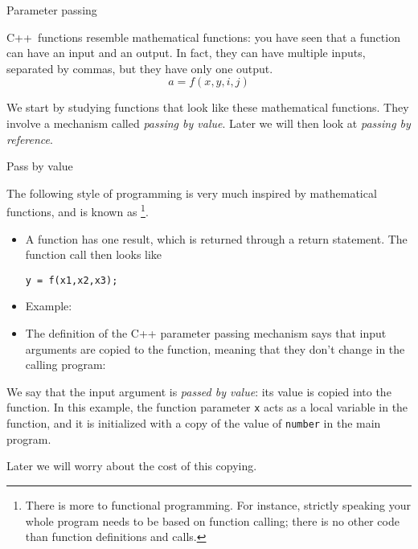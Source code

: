  {Parameter passing}
\label{sec:passing}
%

C++~functions resemble mathematical functions: you have seen that a
function can have an input and an output. In fact, they can have
multiple inputs, separated by commas, but they have only one
output.
\[ a = f(x,y,i,j) \]

We start by studying functions that look like these mathematical
functions. They involve a  mechanism
called
\emph{passing by value}.
%
Later we will then look at
\emph{passing by reference}.

 {Pass by value}
\label{sec:pass-value}

The following style of programming is very much inspired by
mathematical functions, and is known as \footnote {There is more to functional programming. For
  instance, strictly speaking your whole program needs to be based on
  function calling; there is no other code than function definitions
  and calls.}.
\begin{itemize}
\item A function has one result, which is returned through a return
  statement. The function call then looks like
\begin{lstlisting}
y = f(x1,x2,x3);
\end{lstlisting}
\item Example:
\item The definition of the C++ parameter passing mechanism says that
  input arguments are copied to the function, meaning that they don't
  change in the calling program:

\end{itemize}

We say that the input argument is
\emph{passed by value}:
its value is copied into the
function.  In this example, the function parameter \lstinline{x} acts as a
local variable in the function, and it is initialized with a copy of
the value of \lstinline{number} in the main program.

Later we will worry about the cost of this copying.

